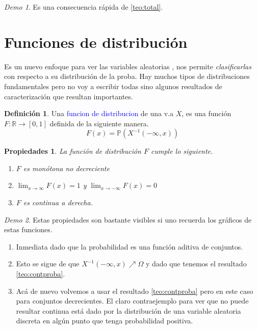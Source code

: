 \documentclass[11pt]{article}
\theoremstyle{plain} %
\newtheorem*{props}{Propiedades}
\theoremstyle{definition}
\newtheorem*{definicion}{Definici\'{o}n} %
\theoremstyle{remark}
\newtheorem*{demo}{Demo}
\def\Om{\Omega}
\def\R{\mathbb{R}}
\def\P{\mathbb{P}}
\def\va{variable aleatoria }
\def\vas{variables aleatorias }
\def\blue{\textcolor{blue}}
\begin{document}
\begin{demo}
	Es una consecuencia r\'apida de \ref{teo:total}.
\end{demo}
\bigskip

\section{Funciones de distribuci\'on}

Es un nuevo enfoque para ver las \vas, nos permite \textit{clasificarlas} con respecto a su distribución de la proba. Hay muchos tipos de distribuciones fundamentales pero no voy a escribir todas sino algunos resultados de caracterización que resultan importantes. 

\begin{definicion}
	Una \blue{funcion de distribucion} de una v.a $X$, es una funci\'on $F:\R \to [0,1]$ definida de la siguiente manera.
	\[F(x) = \P \left( X^{-1}(-\infty,x) \right)\]
\end{definicion}

\begin{props}
	La funci\'on de distribuci\'on $F$ cumple lo siguiente.
	\begin{enumerate}
		\item $F$ es mon\'otona no decreciente 
		\item $\lim_{x \to \infty} F(x) = 1 $ y $\lim_{x \to - \infty} F(x) = 0$
		\item $F$ es continua a derecha.
	\end{enumerate}
\end{props}

\begin{demo}
Estas propiedades son bastante visibles si uno recuerda los gr\'aficos de estas funciones.
	\begin{enumerate}
		\item Inmediata dado que la probabilidad es una funci\'on aditiva de conjuntos.
		\item Esto se sigue de que $X^{-1}(-\infty, x) \nearrow \Om$ y dado que tenemos el resultado \ref{teo:contproba}.
		\item Ac\'a de nuevo volvemos a usar el resultado \ref{teo:contproba} pero en este caso para conjuntos decrecientes. El claro contraejemplo para ver que no puede resultar continua est\'a dado por la distribuci\'on de una \va discreta en alg\'un punto que tenga probabilidad positiva.
	\end{enumerate}
\end{demo}
\end{document}
